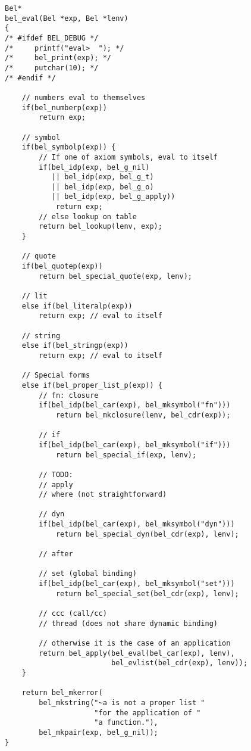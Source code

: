 \documentclass[openright,a4paper,twoside,12pt]{memoir}
\begin{document}
\begin{verbatim}
Bel*
bel_eval(Bel *exp, Bel *lenv)
{
/* #ifdef BEL_DEBUG */
/*     printf("eval>  "); */
/*     bel_print(exp); */
/*     putchar(10); */
/* #endif */

    // numbers eval to themselves
    if(bel_numberp(exp))
        return exp;
    
    // symbol
    if(bel_symbolp(exp)) {
        // If one of axiom symbols, eval to itself
        if(bel_idp(exp, bel_g_nil)
           || bel_idp(exp, bel_g_t)
           || bel_idp(exp, bel_g_o)
           || bel_idp(exp, bel_g_apply))
            return exp;
        // else lookup on table
        return bel_lookup(lenv, exp);
    }

    // quote
    if(bel_quotep(exp))
        return bel_special_quote(exp, lenv);
    
    // lit
    else if(bel_literalp(exp))
        return exp; // eval to itself

    // string
    else if(bel_stringp(exp))
        return exp; // eval to itself

    // Special forms
    else if(bel_proper_list_p(exp)) {
        // fn: closure
        if(bel_idp(bel_car(exp), bel_mksymbol("fn")))
            return bel_mkclosure(lenv, bel_cdr(exp));
    
        // if
        if(bel_idp(bel_car(exp), bel_mksymbol("if")))
            return bel_special_if(exp, lenv);

        // TODO:
        // apply
        // where (not straightforward)
        
        // dyn
        if(bel_idp(bel_car(exp), bel_mksymbol("dyn")))
            return bel_special_dyn(bel_cdr(exp), lenv);
        
        // after
        
        // set (global binding)
        if(bel_idp(bel_car(exp), bel_mksymbol("set")))
            return bel_special_set(bel_cdr(exp), lenv);
        
        // ccc (call/cc)
        // thread (does not share dynamic binding)

        // otherwise it is the case of an application
        return bel_apply(bel_eval(bel_car(exp), lenv),
                         bel_evlist(bel_cdr(exp), lenv));
    }

    return bel_mkerror(
        bel_mkstring("~a is not a proper list "
                     "for the application of "
                     "a function."),
        bel_mkpair(exp, bel_g_nil));
}
\end{verbatim}
\end{document}
